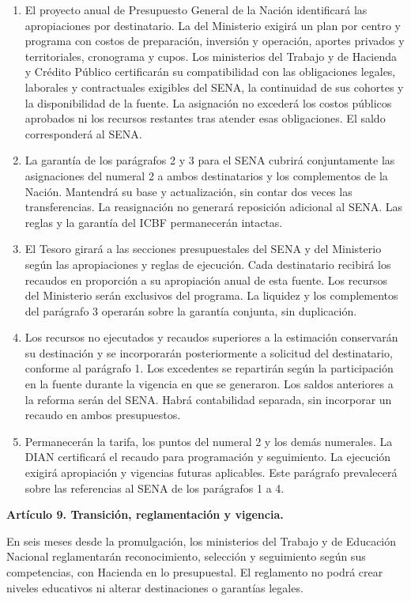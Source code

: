 \begin{mdframed}[linewidth=0.6pt,linecolor=gray!60,backgroundcolor=gray!3,
  innertopmargin=10pt,innerbottommargin=10pt,innerleftmargin=10pt,innerrightmargin=10pt]
\begin{enumerate}[label=\alph*),leftmargin=*]
\item El proyecto anual de Presupuesto General de la Nación identificará las apropiaciones por destinatario. La del Ministerio exigirá un plan por centro y programa con costos de preparación, inversión y operación, aportes privados y territoriales, cronograma y cupos. Los ministerios del Trabajo y de Hacienda y Crédito Público certificarán su compatibilidad con las obligaciones legales, laborales y contractuales exigibles del SENA, la continuidad de sus cohortes y la disponibilidad de la fuente. La asignación no excederá los costos públicos aprobados ni los recursos restantes tras atender esas obligaciones. El saldo corresponderá al SENA.
\item La garantía de los parágrafos 2 y 3 para el SENA cubrirá conjuntamente las asignaciones del numeral 2 a ambos destinatarios y los complementos de la Nación. Mantendrá su base y actualización, sin contar dos veces las transferencias. La reasignación no generará reposición adicional al SENA. Las reglas y la garantía del ICBF permanecerán intactas.
\item El Tesoro girará a las secciones presupuestales del SENA y del Ministerio según las apropiaciones y reglas de ejecución. Cada destinatario recibirá los recaudos en proporción a su apropiación anual de esta fuente. Los recursos del Ministerio serán exclusivos del programa. La liquidez y los complementos del parágrafo 3 operarán sobre la garantía conjunta, sin duplicación.
\item Los recursos no ejecutados y recaudos superiores a la estimación conservarán su destinación y se incorporarán posteriormente a solicitud del destinatario, conforme al parágrafo 1. Los excedentes se repartirán según la participación en la fuente durante la vigencia en que se generaron. Los saldos anteriores a la reforma serán del SENA. Habrá contabilidad separada, sin incorporar un recaudo en ambos presupuestos.
\item Permanecerán la tarifa, los puntos del numeral 2 y los demás numerales. La DIAN certificará el recaudo para programación y seguimiento. La ejecución exigirá apropiación y vigencias futuras aplicables. Este parágrafo prevalecerá sobre las referencias al SENA de los parágrafos 1 a 4.
\end{enumerate}

\textbf{Artículo 9. Transición, reglamentación y vigencia.}

En seis meses desde la promulgación, los ministerios del Trabajo y de Educación Nacional reglamentarán reconocimiento, selección y seguimiento según sus competencias, con Hacienda en lo presupuestal. El reglamento no podrá crear niveles educativos ni alterar destinaciones o garantías legales.


\end{mdframed}
